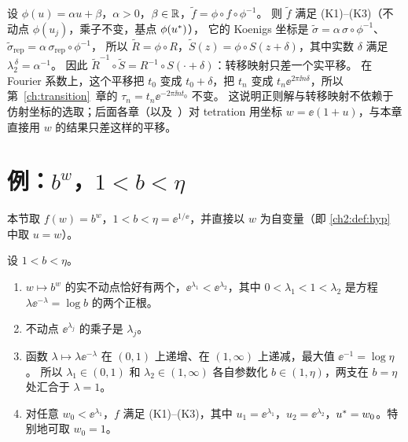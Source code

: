 \begin{remark}[坐标变换]\label{ch2:rem:coordinates}
设 $\phi(u)=\alpha u+\beta$，$\alpha>0$，$\beta\in\mathbb{R}$，$\tilde f=\phi\circ f\circ\phi^{-1}$。
则 $\tilde f$ 满足 (K1)--(K3)（不动点 $\phi(u_j)$，乘子不变，基点 $\phi(u^{*})$），
它的 Koenigs 坐标是 $\tilde\sigma=\alpha\,\sigma\circ\phi^{-1}$、$\tilde\sigma_{\mathrm{rep}}=\alpha\,\sigma_{\mathrm{rep}}\circ\phi^{-1}$，
所以 $\tilde R=\phi\circ R$，$\tilde S(z)=\phi\circ S(z+\delta)$，其中实数 $\delta$ 满足 $\lambda_2^{\,\delta}=\alpha^{-1}$。
因此 $\tilde R^{-1}\circ\tilde S=R^{-1}\circ S(\cdot+\delta)$：转移映射只差一个实平移。
在 Fourier 系数上，这个平移把 $t_0$ 变成 $t_0+\delta$，把 $t_n$ 变成 $t_n\ee^{2\pi\ii n\delta}$，所以第~\ref{ch:transition}~章的 $\tau_n=t_n\ee^{-2\pi\ii nt_0}$ 不变。
这说明正则解与转移映射不依赖于仿射坐标的选取；后面各章（以及~\cite{KneserPaper}）对 tetration 用坐标 $w=\ee(1+u)$，与本章直接用 $w$ 的结果只差这样的平移。
\end{remark}

\section[例：指数映射]{例：$b^w$，$1<b<\eta$}\label{ch2:sec:bw}

本节取 $f(w)=b^w$，$1<b<\eta=\ee^{1/\ee}$，并直接以 $w$ 为自变量（即 \cref{ch2:def:hyp} 中取 $u=w$）。

\begin{lemma}[参数化]\label{ch2:lem:param}
设 $1<b<\eta$。
\begin{enumerate}[label=(\alph*)]
\item $w\mapsto b^w$ 的实不动点恰好有两个，$\ee^{\lambda_1}<\ee^{\lambda_2}$，其中 $0<\lambda_1<1<\lambda_2$ 是方程 $\lambda\ee^{-\lambda}=\log b$ 的两个正根。
\item 不动点 $\ee^{\lambda_j}$ 的乘子是 $\lambda_j$。
\item 函数 $\lambda\mapsto\lambda\ee^{-\lambda}$ 在 $(0,1)$ 上递增、在 $(1,\infty)$ 上递减，最大值 $\ee^{-1}=\log\eta$。
  所以 $\lambda_1\in(0,1)$ 和 $\lambda_2\in(1,\infty)$ 各自参数化 $b\in(1,\eta)$，两支在 $b=\eta$ 处汇合于 $\lambda=1$。
\item 对任意 $w_0<\ee^{\lambda_1}$，$f$ 满足 \textup{(K1)--(K3)}，其中 $u_1=\ee^{\lambda_1}$，$u_2=\ee^{\lambda_2}$，$u^{*}=w_0$。特别地可取 $w_0=1$。
\end{enumerate}
\end{lemma}

